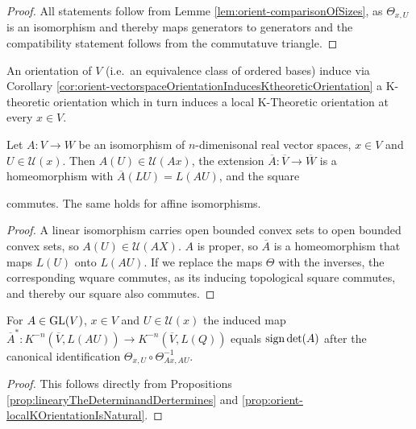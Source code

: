 \begin{proof}
    All statements follow from Lemme \ref{lem:orient-comparisonOfSizes}, as $\Theta_{x,U}$ is an isomorphism and thereby maps generators to generators and the compatibility statement follows from the commutatuve triangle.
\end{proof}
\begin{corollary}
    An orientation of $V$ (i.e.\ an equivalence class of ordered bases) induce via Corollary \ref{cor:orient-vectorspaceOrientationInducesKtheoreticOrientation} a K-theoretic orientation which in turn induces a local K-Theoretic orientation at every $x\in V$.
\end{corollary}

\begin{proposition}[Naturality]\label{prop:orient-localKOrientationIsNatural}
    Let $A:V\to W$ be an isomorphism of $n$-dimenisonal real vector spaces, $x\in V$ and $U\in \mathcal{U}(x)$. Then $A(U)\in \mathcal{U}(Ax)$, the extension $\overline{A}:\overline{V} \to \overline{W}$ is a homeomorphism with $\overline{A}(LU)=L(AU)$, and the square
    \begin{center}
    \end{center} commutes. The same holds for affine isomorphisms.
\end{proposition}
\begin{proof}
    A linear isomorphism carries open bounded convex sets to open bounded convex sets, so $A(U)\in \mathcal{U}(AX)$. $A$ is proper, so $\overline{A}$ is a homeomorphism that maps $L(U)$ onto $L(AU)$. If we replace the maps $\Theta$ with the inverses, the corresponding wquare commutes, as its inducing topological square commutes, and thereby our square also commutes.
\end{proof}

\begin{corollary}
    For $A\in \mathrm{GL}(V)$, $x\in V$ and $U\in \mathcal{U}(x)$ the induced map $\overline{A}^*:K^{-n}(\overline{V},L(AU))\to K^{-n}(\overline{V},L(Q))$ equals $\mathrm{sign} \det(A)$ after the canonical identification $\Theta_{x,U}\circ \Theta_{Ax,AU}^{-1}$.
\end{corollary}
\begin{proof}
    This follows directly from Propositions \ref{prop:linearyTheDeterminandDertermines} and \ref{prop:orient-localKOrientationIsNatural}.
\end{proof}
